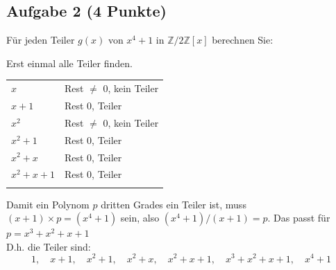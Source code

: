 \documentclass{article} %
\begin{document}
\subsection*{Aufgabe 2 (4 Punkte)}  
Für jeden Teiler $g(x)$ von $x^4 + 1$ in $\mathbb{Z}/2\mathbb{Z}[x]$ berechnen Sie:
\begin{mybox}
Erst einmal alle Teiler finden. 
\begin{table}[H]
    \centering
    \begin{tabular}{p{3cm}p{5cm}}
        $x$ & Rest $\neq$ 0, kein Teiler  \\
        $x+1$ & Rest 0, Teiler \\
        $x^2$ & Rest $\neq$ 0, kein Teiler \\
        $x^2 +1$ & Rest 0, Teiler \\
        $x^2 +x$ & Rest 0, Teiler \\
        $x^2 +x +1$ & Rest 0, Teiler \\ \\
    \end{tabular}
\end{table}
Damit ein Polynom $p$ dritten Grades ein Teiler ist, muss $(x+1) \times p = (x^4+1)$ sein, also $(x^4+1) / (x+1) = p$. Das passt für $p = x^3 + x^2 + x + 1$ \\
D.h. die Teiler sind: 
\[1, \quad x+1,\quad x^2 +1, \quad x^2 +x, \quad x^2 +x +1, \quad x^3 + x^2 + x + 1, \quad x^4 +1\]
\end{mybox}
\end{document}
